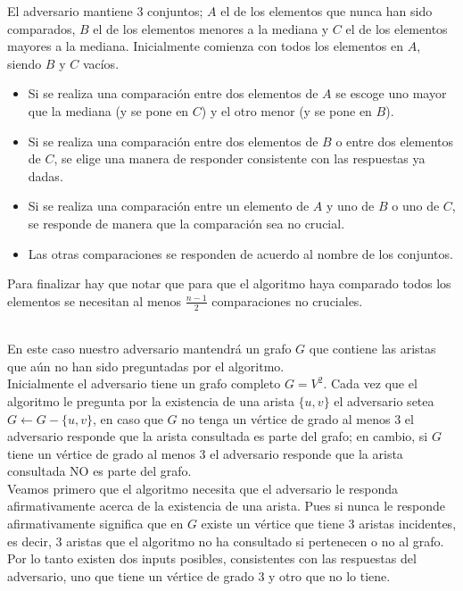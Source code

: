 \documentclass[dcc,uchile]{fcfmcourse}
\theoremstyle{plain}
\theoremstyle{definition}
\begin{document}
\begin{problems}
\begin{enumerate}[a)]
    El adversario mantiene $3$ conjuntos; $A$ el de los elementos que nunca han sido comparados, $B$ el de los elementos menores a la mediana y $C$ el de los elementos mayores a la mediana. Inicialmente comienza con todos los elementos en $A$, siendo $B$ y $C$ vacíos.
    \begin{itemize}
        \item Si se realiza una comparación entre dos elementos de $A$ se escoge uno mayor que la mediana (y se pone en $C$) y el otro menor (y se pone en $B$).
        \item Si se realiza una comparación entre dos elementos de $B$ o entre dos elementos de $C$, se elige una manera de responder consistente con las respuestas ya dadas.
        \item Si se realiza una comparación entre un elemento de $A$ y uno de $B$ o uno de $C$, se responde de manera que la comparación sea no crucial.
        \item Las otras comparaciones se responden de acuerdo al nombre de los conjuntos.
    \end{itemize}

\end{enumerate}

Para finalizar hay que notar que para que el algoritmo haya comparado todos los elementos se necesitan al menos $\frac{n-1}{2}$ comparaciones no cruciales.

\\

En este caso nuestro adversario mantendrá un grafo $G$ que contiene las aristas que aún no han sido preguntadas por el algoritmo.\\

Inicialmente el adversario tiene un grafo completo $G = V^2$. Cada vez que el algoritmo le pregunta por la existencia de una arista $\{u,v\}$ el adversario setea $G\gets G - \{u,v\}$, en caso que $G$ no tenga un vértice de grado al menos $3$ el adversario responde que la arista consultada es parte del grafo; en cambio, si $G$ tiene un vértice de grado al menos $3$ el adversario responde que la arista consultada NO es parte del grafo.\\

Veamos primero que el algoritmo necesita que el adversario le responda afirmativamente acerca de la existencia de una arista. Pues si nunca le responde afirmativamente significa que en $G$ existe un vértice que tiene $3$ aristas incidentes, es decir, $3$ aristas que el algoritmo no ha consultado si pertenecen o no al grafo. Por lo tanto existen dos inputs posibles, consistentes con las respuestas del adversario, uno que tiene un vértice de grado $3$ y otro que no lo tiene.\\


\end{problems}
\end{document}
